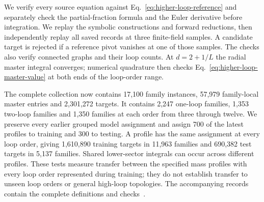 We verify every source equation against
Eq.~\eqref{eq:higher-loop-reference} and separately check the
partial-fraction formula and the Euler derivative before integration. We replay the symbolic constructions
and forward reductions, then independently replay all saved records
at three finite-field samples. A candidate target is rejected if a
reference pivot vanishes at one of those samples. The checks also
verify connected graphs and their loop counts. At $d=2+1/L$ the
radial master integral converges; numerical quadrature then checks
Eq.~\eqref{eq:higher-loop-master-value} at both ends of the loop-order
range.

The complete collection now contains 17,100 family instances,
57,979 family-local master entries and 2,301,272 targets. It contains
2,247 one-loop families, 1,353 two-loop families and 1,350 families
at each order from three through twelve. We preserve every earlier
grouped model assignment and assign 700 of the latest profiles to
training and 300 to testing. A profile has the same assignment at
every loop order, giving 1,610,890 training targets in 11,963 families
and 690,382 test targets in 5,137 families. Shared lower-sector integrals can occur
across different profiles. These tests measure transfer between the
specified mass profiles with every loop order represented during
training; they do not establish transfer to unseen loop orders or
general high-loop topologies. The accompanying records contain the
complete definitions and checks~\cite{HigherLoopIntegralData}.

